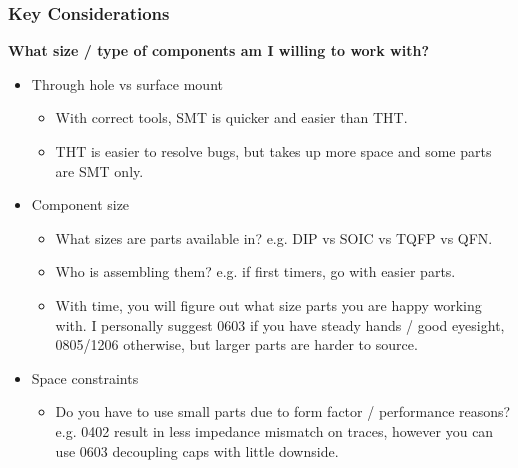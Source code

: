 \documentclass[t]{beamer}
\begin{document}

\begin{frame}
\frametitle{Key Considerations}
\large{\textbf{What size / type of components am I willing to work with?}}
\vspace{1mm}
\begin{itemize}
	\item Through hole vs surface mount
	\begin{itemize}
		\item With correct tools, SMT is quicker and easier than THT. 
		\item THT is easier to resolve bugs, but takes up more space and some parts are SMT only. 
	\end{itemize} 
	\item Component size
	\begin{itemize}
		\item What sizes are parts available in? e.g. DIP vs SOIC vs TQFP vs QFN.
		\item Who is assembling them? e.g. if first timers, go with easier parts. 
		\item With time, you will figure out what size parts you are happy working with. I personally suggest 0603 if you have steady hands / good eyesight, 0805/1206 otherwise, but larger parts are harder to source. 
	\end{itemize}
	\item Space constraints
	\begin{itemize}
		\item Do you have to use small parts due to form factor / performance reasons? e.g. 0402 result in less impedance mismatch on traces, however you can use 0603 decoupling caps with little downside.   
	\end{itemize}
\end{itemize}
\end{frame}

\end{document}
